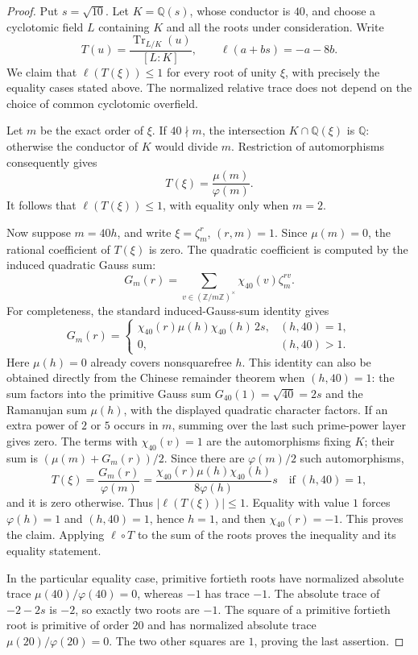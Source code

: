 \begin{proof}
Put $s=\sqrt{10}$. Let $K=\mathbb Q(s)$, whose conductor is $40$, and choose a cyclotomic field
$L$ containing $K$ and all the roots under consideration. Write
\[
 T(u)=\frac{\operatorname{Tr}_{L/K}(u)}{[L:K]},\qquad
 \ell(a+bs)=-a-8b.
\]
We claim that $\ell(T(\xi))\leq1$ for every root of unity $\xi$, with precisely
the equality cases stated above. The normalized relative trace does not depend
on the choice of common cyclotomic overfield.

Let $m$ be the exact order of $\xi$. If $40\nmid m$, the intersection
$K\cap\mathbb Q(\xi)$ is $\mathbb Q$: otherwise the conductor of $K$ would
divide $m$. Restriction of automorphisms consequently gives
\[
 T(\xi)=\frac{\mu(m)}{\varphi(m)}.
\]
It follows that $\ell(T(\xi))\leq1$, with equality only when $m=2$.

Now suppose $m=40h$, and write $\xi=\zeta_m^r$, $(r,m)=1$. Since $\mu(m)=0$,
the rational coefficient of $T(\xi)$ is zero. The quadratic coefficient is
computed by the induced quadratic Gauss sum:
\[
 G_m(r)=\sum_{v\in(\mathbb Z/m\mathbb Z)^\times}
             \chi_{40}(v)\zeta_m^{rv}.
\]
For completeness, the standard induced-Gauss-sum identity gives
\[
 G_m(r)=
 \begin{cases}
 \chi_{40}(r)\mu(h)\chi_{40}(h)\,2s,&(h,40)=1,\\
 0,&(h,40)>1.
 \end{cases}
\]
Here $\mu(h)=0$ already covers nonsquarefree $h$. This identity can also be
obtained directly from the Chinese remainder theorem when $(h,40)=1$:
the sum factors into the primitive Gauss sum
$G_{40}(1)=\sqrt{40}=2s$ and the Ramanujan sum $\mu(h)$, with the displayed
quadratic character factors. If an extra power of $2$ or $5$ occurs in $m$,
summing over the last such prime-power layer gives zero.
The terms with $\chi_{40}(v)=1$ are the automorphisms fixing $K$; their sum
is $(\mu(m)+G_m(r))/2$. Since there are $\varphi(m)/2$ such automorphisms,
\[
 T(\xi)=\frac{G_m(r)}{\varphi(m)}
 =\frac{\chi_{40}(r)\mu(h)\chi_{40}(h)}{8\varphi(h)}s
 \quad\text{if }(h,40)=1,
\]
and it is zero otherwise. Thus $|\ell(T(\xi))|\leq1$. Equality with value
$1$ forces $\varphi(h)=1$ and $(h,40)=1$, hence $h=1$, and then
$\chi_{40}(r)=-1$. This proves the claim. Applying $\ell\circ T$ to the sum
of the roots proves the inequality and its equality statement.

In the particular equality case, primitive fortieth roots have normalized
absolute trace $\mu(40)/\varphi(40)=0$, whereas $-1$ has trace $-1$.
The absolute trace of $-2-2s$ is $-2$, so exactly two roots are $-1$.
The square of a primitive fortieth root is primitive of order $20$ and has
normalized absolute trace $\mu(20)/\varphi(20)=0$. The two other squares
are $1$, proving the last assertion.
\end{proof}
